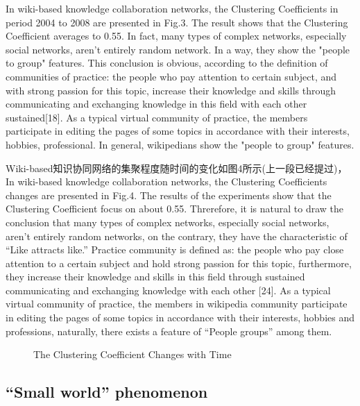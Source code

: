 \documentclass{elsarticle}
\begin{document}
In wiki-based knowledge collaboration networks, the Clustering Coefficients in period 2004 to 2008 are presented in Fig.3. The result shows that the Clustering Coefficient averages to 0.55. In fact, many types of complex networks, especially social networks, aren’t entirely random network. In a way, they show the "people to group" features. This conclusion is obvious, according to the definition of communities of practice: the people who pay attention to certain subject, and with strong passion for this topic, increase their knowledge and skills through communicating and exchanging knowledge in this field with each other sustained[18]. As a typical virtual community of practice, the members participate in editing the pages of some topics  in accordance with their interests, hobbies, professional. In general, wikipedians show the "people to group" features.

Wiki-based知识协同网络的集聚程度随时间的变化如图4所示(上一段已经提过)，In wiki-based knowledge collaboration networks, the Clustering Coefficients changes are presented in Fig.4. The results of the experiments show that the Clustering Coefficient focus on about 0.55. Threrefore, it is natural to draw the conclusion that many types of complex networks, especially social networks, aren’t entirely random networks, on the contrary, they have the characteristic of “Like attracts like.” Practice community is defined as: the people who pay close attention to a certain subject and hold strong passion for this topic, furthermore, they increase their knowledge and skills in this field through sustained communicating and exchanging knowledge with each other [24]. As a typical virtual community of practice, the members in wikipedia community participate in editing the pages of some topics in accordance with their interests, hobbies and professions, naturally, there exists a feature of “People groups” among them.
\begin{figure}[htpb]
  \centering
  \scalebox{0.3}{\texttt{[image: 04]}}
  \caption{ The Clustering Coefficient Changes with Time}
\end{figure}

\subsection{“Small world” phenomenon }
\label{sec:small-world-phen}
\end{document}
